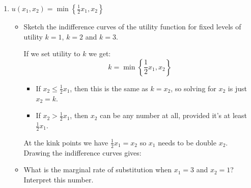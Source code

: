 \documentclass[12pt]{article}
\newcounter{question}[section]
\newenvironment{subquestions}{
  \begin{enumerate}[label=(\roman*)]}{\end{enumerate}}
\begin{document}
\begin{subquestions}
\begin{itemize}
        \textcolor{solution-color}{
          An example of two ``goods'' that could satisfy these preferences are
          \$5 and \$10 bills. A \$10 bill would normally give people twice the
          utility as a \$5 bill (or you are indifferent between 2 \$5 bills and
          one \$10 bill). So $x_1$ could be a \$5 bill and $x_2$ could
          be a \$10 bill.
        }
    \end{itemize}
  \item $u\left( x_1,x_2 \right)=\min\left\{\frac{1}{2}x_1, x_2\right\}$
    \begin{itemize}
      \item Sketch the indifference curves of the utility function for
        fixed levels of utility $k=1$, $k=2$ and $k=3$.

        \textcolor{solution-color}{
          If we set utility to $k$ we get:
          \[
            k = \min\left\{\frac{1}{2}x_1, x_2\right\}
          \]
          \begin{itemize}
            \item If $x_2\leq \frac{1}{2}x_1$, then this is the same as
              $k=x_2$, so solving for $x_2$ is just $x_2 = k$.
            \item If $x_2>\frac{1}{2}x_1$, then $x_2$ can be any
              number at all, provided it's at least $\frac{1}{2}x_1$.
          \end{itemize}
          At the kink points we have $\frac{1}{2}x_1=x_2$ so $x_1$ needs to be
          double $x_2$. Drawing the indifference curves gives:
          \begin{center}
          \end{center}
        }
      \item What is the marginal rate of substitution when $x_1 = 3$ and
        $x_2=1$? Interpret this number.


\end{itemize}
\end{subquestions}
\end{document}
